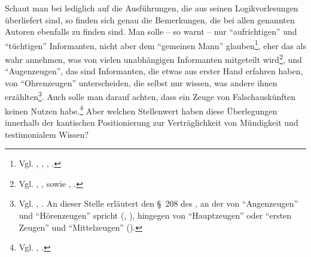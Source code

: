 Schaut man bei  lediglich auf die Ausführungen, die aus
seinen Logikvorlesungen überliefert sind, so finden sich genau die Bemerkungen,
die bei allen genannten Autoren ebenfalls zu finden sind. Man solle -- so warnt
 -- nur \enquote{aufrichtigen} und \enquote{tüchtigen}
Informanten, nicht aber dem \enquote{gemeinen Mann}
glauben\footnote{Vgl. \cite{Kant:LogikPoelitz1966},
\cite[][XXIV: 562.30--38]{Kant:GesammelteWerke1900ff.},
\cite{Kant:WienerLogik1966}, \cite[][XXIV: 898.1--22]{Kant:GesammelteWerke1900ff.}.}, eher das als wahr
annehmen, was von vielen unabhängigen Informanten mitgeteilt
wird\footnote{Vgl. \cite{Kant:LogikPhilippi1966}, \cite[][XXIV:
450.23--28]{Kant:GesammelteWerke1900ff.}, sowie \cite{Kant:LogikPoelitz1966},
\cite[][XXIV: 563.15--17]{Kant:GesammelteWerke1900ff.}.}, und
\enquote{Augenzeugen}, das sind Informanten, die etwas aus erster Hand erfahren
haben, von \enquote{Ohrenzeugen} unterscheiden, die selbst nur wissen, was
andere ihnen
erzählten\footnote{\label{Anmerkung:AugenzeugenundOhrenzeugen}Vgl.
\cite{Kant:LogikPhilippi1966}, \cite[][XXIV:
450.20--28]{Kant:GesammelteWerke1900ff.}. An dieser Stelle erläutert
 den \S~208 des , an
der  von
\enquote{Augenzeugen} und \enquote{Hörenzeugen} spricht
(\cite[vgl.][\S~208]{Meier:AuszugausderVernunftlehre1752}, \cite[][XVI:
505.20--23]{Kant:GesammelteWerke1900ff.}),
hingegen von \enquote{Hauptzeugen} oder \enquote{ersten Zeugen} und
\enquote{Mittelzeugen}
(\cite[vgl.][\S\S~249--251]{Reimarus:DieVernunftlehrealseineAnweisungzumrichtigenGebrauchderVernunftinderErkenntnisderWahrheit1756}).}.
Auch solle man darauf achten, dass ein Zeuge von Falschauskünften keinen Nutzen
habe.\footnote{Vgl. \cite{Kant:LogikPhilippi1966}, \cite[][XXIV:
450.3--4]{Kant:GesammelteWerke1900ff.}.} Aber welchen Stellenwert haben diese Überlegungen innerhalb der kantischen
Positionierung zur Verträglichkeit von Mündigkeit und testimonialem Wissen?

